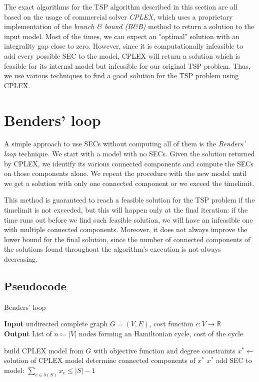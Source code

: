 The exact algorithms for the TSP algorithm described in this section are all based on the usage of commercial solver \textit{CPLEX}, which uses a proprietary implementation of the \textit{branch \& bound (B\&B)} method to return a solution to the input model. Most of the times, we can expect an "optimal" solution with an integrality gap close to zero. However, since it is computationally infeasible to add every possible SEC to the model, CPLEX will return a solution which is feasible for its internal model but infeasible for our original TSP problem. Thus, we use various techniques to find a good solution for the TSP problem using CPLEX.

\section{Benders' loop}
A simple approach to use SECs without computing all of them is the \textit{Benders' loop} technique. We start with a model with no SECs. Given the solution returned by CPLEX, we identify its various connected components and compute the SECs on those components alone. We repeat the procedure with the new model until we get a solution with only one connected component or we exceed the timelimit.

This method is guaranteed to reach a feasible solution for the TSP problem if the timelimit is not exceeded, but this will happen only at the final iteration: if the time runs out before we find such feasible solution, we will have an infeasible one with multiple connected components. Moreover, it does not always improve the lower bound for the final solution, since the number of connected components of the solutions found throughout the algorithm's execution is not always decreasing.

\FloatBarrier
\subsection{Pseudocode}
\begin{algorithm}[h]
    \caption{Benders' loop}
    \hspace*{\algorithmicindent} \textbf{Input} undirected complete graph $G=(V,E)$, cost function $c:V\rightarrow\mathbb{R}$\\
    \hspace*{\algorithmicindent} \textbf{Output} List of $n\coloneq|V|$ nodes forming an Hamiltonian cycle, cost of the cycle
    \begin{algorithmic}

        \State build CPLEX model from $G$ with objective function and degree constraints
        \State $x^* \leftarrow$ solution of CPLEX model
        \State determine connected components of $x^*$
        \Return $x^*$
        \EndIf
        \State add SEC to model: $\sum_{e\in\delta(S)}x_e\leq|S|-1$
        \EndFor
        \EndWhile

    \end{algorithmic}
\end{algorithm}
\FloatBarrier

